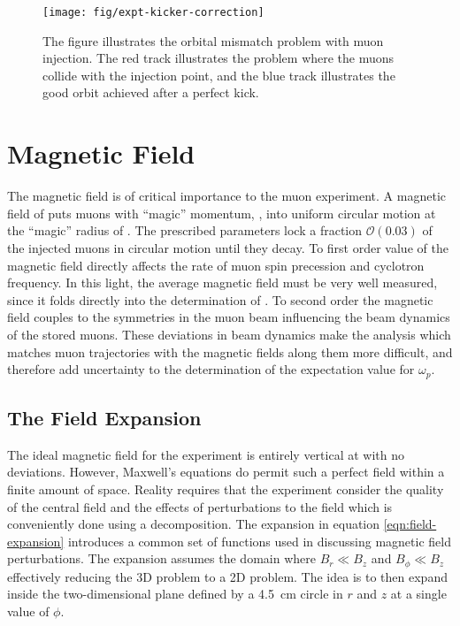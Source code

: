 \begin{figure}
\centering
\texttt{[image: fig/expt-kicker-correction]}
\caption{The figure illustrates the orbital mismatch problem with muon injection.  The red track illustrates the problem where the muons collide with the injection point, and the blue track illustrates the good orbit achieved after a perfect kick. \label{fig:expt-kicker-correction}}
\end{figure}

\section{Magnetic Field} \label{sec:magnetic-field}

The magnetic field is of critical importance to the muon \gmtwo experiment.  A magnetic field of \bmagic puts muons with ``magic'' momentum, \pmagic, into uniform circular motion at the ``magic'' radius of \rmagic.  The prescribed parameters lock a fraction $\mathcal{O}(0.03)$ of the injected muons in circular motion until they decay.  To first order value of the magnetic field directly affects the rate of muon spin precession and cyclotron frequency.  In this light, the average magnetic field must be very well measured, since it folds directly into the determination of \wa.  To second order the magnetic field couples to the symmetries in the muon beam influencing the beam dynamics of the stored muons.  These deviations in beam dynamics make the analysis which matches muon trajectories with the magnetic fields along them more difficult, and therefore add uncertainty to the determination of the expectation value for $\omega_p$.

\subsection{The Field Expansion}

The ideal magnetic field for the experiment is entirely vertical at \bmagic with no deviations.  However, Maxwell's equations do permit such a perfect field within a finite amount of space.  Reality requires that the experiment consider the quality of the central field and the effects of perturbations to the field which is conveniently done using a decomposition.  The expansion in equation \ref{eqn:field-expansion} introduces a common set of functions used in discussing magnetic field perturbations.  The expansion assumes the domain where $B_r \ll B_z$ and $B_\phi \ll B_z$ effectively reducing the 3D problem to a 2D problem.  The idea is to then expand inside the two-dimensional plane defined by a \SI{4.5}{\cm} circle in $r$ and $z$ at a single value of $\phi$.

